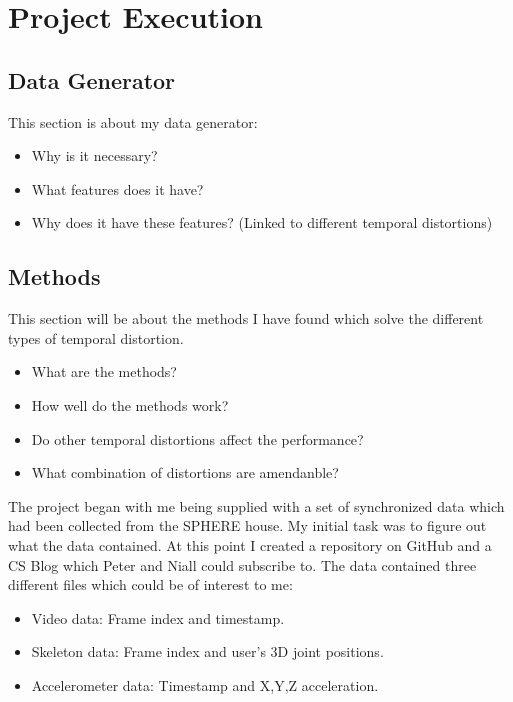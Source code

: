 \chapter{Project Execution}
\label{chap:execution}
%
%
%
%

\section{Data Generator}
This section is about my data generator:
\begin{itemize}
    \item Why is it necessary?
    \item What features does it have?
    \item Why does it have these features? (Linked to different temporal distortions)
\end{itemize}

\section{Methods}
This section will be about the methods I have found which solve the different
types of temporal distortion.
\begin{itemize}
    \item What are the methods?
    \item How well do the methods work?
    \item Do other temporal distortions affect the performance?
    \item What combination of distortions are amendanble?
\end{itemize}

The project began with me being supplied with a set of synchronized data which had been collected from the SPHERE house. My initial task was to figure out what the data contained. At this point I created a repository on GitHub and a CS Blog which Peter and Niall could subscribe to. The data contained three different files which could be of interest to me:
\begin{itemize}
    \item Video data: Frame index and timestamp.
    \item Skeleton data: Frame index and user's 3D joint positions.
    \item Accelerometer data: Timestamp and X,Y,Z acceleration.
\end{itemize}

